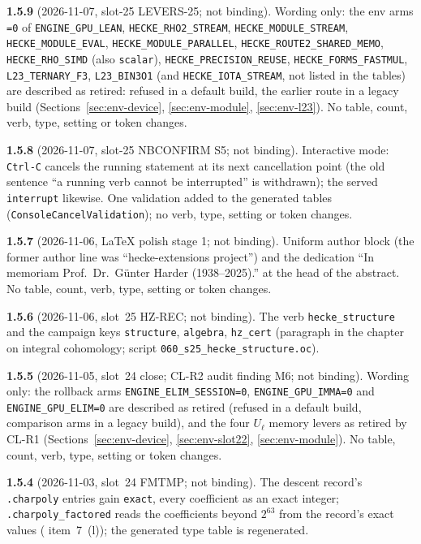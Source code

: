 \documentclass[11pt,openany]{report}
\newcommand{\file}[1]{\nolinkurl{#1}}
\begin{document}
\textbf{1.5.9} (2026-11-07, slot-25 LEVERS-25; not binding). Wording only: the env arms \texttt{=0} of \texttt{ENGINE\_GPU\_LEAN},
\texttt{HECKE\_RHO2\_STREAM}, \texttt{HECKE\_MODULE\_STREAM}, \texttt{HECKE\_MODULE\_EVAL}, \texttt{HECKE\_MODULE\_PARALLEL},
\texttt{HECKE\_ROUTE2\_SHARED\_MEMO}, \texttt{HECKE\_RHO\_SIMD} (also \texttt{scalar}), \texttt{HECKE\_PRECISION\_REUSE},
\texttt{HECKE\_FORMS\_FASTMUL}, \texttt{L23\_TERNARY\_F3}, \texttt{L23\_BIN3O1} (and \texttt{HECKE\_IOTA\_STREAM}, not listed in the tables) are
described as retired: refused in a default build, the earlier route in a legacy build (Sections~\ref{sec:env-device}, \ref{sec:env-module},
\ref{sec:env-l23}). No table, count, verb, type, setting or token changes.

\textbf{1.5.8} (2026-11-07, slot-25 NBCONFIRM S5; not binding). Interactive mode: \texttt{Ctrl-C} cancels the running statement at its next
cancellation point (the old sentence ``a running verb cannot be interrupted'' is withdrawn); the served \texttt{interrupt} likewise. One
validation added to the generated tables (\texttt{ConsoleCancelValidation}); no verb, type, setting or token changes.

\textbf{1.5.7} (2026-11-06, LaTeX polish stage 1; not binding). Uniform author block (the former author line was ``hecke-extensions project'') and the
dedication ``In memoriam Prof.\ Dr.\ G\"unter Harder (1938--2025).'' at the head of the abstract. No table, count, verb, type, setting or token changes.

\textbf{1.5.6} (2026-11-06, slot~25 HZ-REC; not binding). The verb \texttt{hecke\_structure} and the campaign keys
\texttt{structure}, \texttt{algebra}, \texttt{hz\_cert} (paragraph in the chapter on integral cohomology; script \file{060_s25_hecke_structure.oc}).

\textbf{1.5.5} (2026-11-05, slot~24 close; CL-R2 audit finding M6; not binding). Wording only: the rollback arms
\texttt{ENGINE\_ELIM\_SESSION=0}, \texttt{ENGINE\_GPU\_IMMA=0} and \texttt{ENGINE\_GPU\_ELIM=0} are described as retired (refused in a
default build, comparison arms in a legacy build), and the four $U_\ell$ memory levers as retired by CL-R1
(Sections~\ref{sec:env-device}, \ref{sec:env-slot22}, \ref{sec:env-module}). No table, count, verb, type, setting or token changes.

\textbf{1.5.4} (2026-11-03, slot~24 FMTMP; not binding). The descent record's \texttt{.charpoly} entries gain \texttt{exact}, every
coefficient as an exact integer; \texttt{.charpoly\_factored} reads the coefficients beyond $2^{63}$ from the record's exact values
({} item~7~(l)); the generated type table is regenerated.
\end{document}

